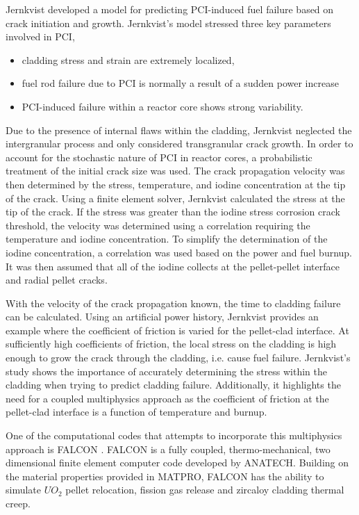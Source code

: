 \documentclass[edeposit,fullpage,11pt]{uiucthesis2009}
\begin{document}
Jernkvist \cite{jernkvist_model_1995} developed a model for predicting \gls{PCI}-induced fuel failure based on crack initiation and growth.
Jernkvist's model stressed three key parameters involved in \gls{PCI},
\begin{itemize} 
\item cladding stress and strain are extremely localized, 
\item fuel rod failure due to \gls{PCI} is normally a result of a sudden power increase 
\item \gls{PCI}-induced failure within a reactor core shows strong variability.
\end{itemize}
Due to the presence of internal flaws within the cladding, Jernkvist neglected the intergranular process and only considered transgranular crack growth.
In order to account for the stochastic nature of \gls{PCI} in reactor cores, a probabilistic treatment of the initial crack size was used.
The crack propagation velocity was then determined by the stress, temperature, and iodine concentration at the tip of the crack.
Using a finite element solver, Jernkvist calculated the stress at the tip of the crack.
If the stress was greater than the iodine stress corrosion crack threshold, the velocity was determined using a correlation requiring the temperature and iodine concentration.
To simplify the determination of the iodine concentration, a correlation was used based on the power and fuel burnup.
It was then assumed that all of the iodine collects at the pellet-pellet interface and radial pellet cracks.

With the velocity of the crack propagation known, the time to cladding failure can be calculated.
Using an artificial power history, Jernkvist provides an example where the coefficient of friction is varied for the pellet-clad interface.
At sufficiently high coefficients of friction, the local stress on the cladding is high enough to grow the crack through the cladding, i.e. cause fuel failure.
Jernkvist's study shows the importance of accurately determining the stress within the cladding when trying to predict cladding failure.
Additionally, it highlights the need for a coupled multiphysics approach as the coefficient of friction at the pellet-clad interface is a function of temperature and burnup.

One of the computational codes that attempts to incorporate this multiphysics approach is FALCON \cite{montgomery_falcon_1997}.
FALCON is a fully coupled, thermo-mechanical, two dimensional finite element computer code  developed by ANATECH.
Building on the material properties provided in MATPRO, FALCON has the ability to simulate $UO_2$ pellet relocation, fission gas release and zircaloy cladding thermal creep.
\end{document}

